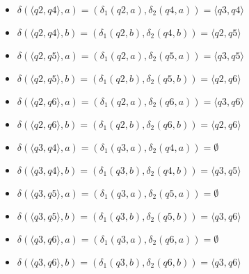 \documentclass[12pt, a4paper]{article}
\begin{document}
\begin{enumerate}
\begin{itemize}
\begin{itemize}
        \item \(\delta(\langle q2,q4 \rangle,a)=(\delta_1(q2,a),\delta_2(q4,a))=\langle q3,q4 \rangle\)
        \item \(\delta(\langle q2,q4 \rangle,b)=(\delta_1(q2,b),\delta_2(q4,b))=\langle q2,q5 \rangle\)
        \item \(\delta(\langle q2,q5 \rangle,a)=(\delta_1(q2,a),\delta_2(q5,a))=\langle q3,q5 \rangle\)
        \item \(\delta(\langle q2,q5 \rangle,b)=(\delta_1(q2,b),\delta_2(q5,b))=\langle q2,q6 \rangle\)
        \item \(\delta(\langle q2,q6 \rangle,a)=(\delta_1(q2,a),\delta_2(q6,a))=\langle q3,q6 \rangle\)
        \item \(\delta(\langle q2,q6 \rangle,b)=(\delta_1(q2,b),\delta_2(q6,b))=\langle q2,q6 \rangle\)
        
        \item \(\delta(\langle q3,q4 \rangle,a)=(\delta_1(q3,a),\delta_2(q4,a))=\emptyset\)
        \item \(\delta(\langle q3,q4 \rangle,b)=(\delta_1(q3,b),\delta_2(q4,b))=\langle q3,q5 \rangle\)
        \item \(\delta(\langle q3,q5 \rangle,a)=(\delta_1(q3,a),\delta_2(q5,a))=\emptyset\)
        \item \(\delta(\langle q3,q5 \rangle,b)=(\delta_1(q3,b),\delta_2(q5,b))=\langle q3,q6 \rangle\)
        \item \(\delta(\langle q3,q6 \rangle,a)=(\delta_1(q3,a),\delta_2(q6,a))=\emptyset\)
        \item \(\delta(\langle q3,q6 \rangle,b)=(\delta_1(q3,b),\delta_2(q6,b))=\langle q3,q6 \rangle\)
    \end{itemize}
\end{itemize}

\begin{comment}
digraph {
    rankdir="LR"
    "" [shape=point]
    q1q4 [shape=circle]
    q2q4 [shape=circle]
    q1q5 [shape=circle]
    q2q5 [shape=circle]
    q1q6 [shape=doublecircle]
    q2q6 [shape=doublecircle]
    q3q4 [shape=circle]
    q3q5 [shape=circle]
    q3q6 [shape=doublecircle]
    
    "" -> q1q4
    q1q4 -> q2q4 [label="a"]
    q1q4 -> q1q5 [label="b"]
    q1q5 -> q2q5 [label="a"]
    q1q5 -> q1q6 [label="b"]
    q1q6 -> q2q6 [label="a"]
    q1q6 -> q1q6 [label="b"]
    q2q4 -> q3q4 [label="a"]
    q2q4 -> q2q5 [label="b"]
    q2q5 -> q3q5 [label="a"]
    q2q5 -> q2q6 [label="b"]
    q2q6 -> q3q6 [label="a"]
    q2q6 -> q2q6 [label="b"]
    q3q4 -> q3q5 [label="b"]
    q3q5 -> q3q6 [label="b"]
    q3q6 -> q3q6 [label="b"]
} 
\end{comment}


\end{enumerate}
\end{document}
